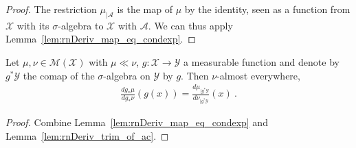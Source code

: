 \begin{proof}\leanok
{}
The restriction $\mu_{| \mathcal A}$ is the map of $\mu$ by the identity, seen as a function from $\mathcal X$ with its $\sigma$-algebra to $\mathcal X$ with $\mathcal{A}$.
We can thus apply Lemma~\ref{lem:rnDeriv_map_eq_condexp}.
\end{proof}


\begin{lemma}
  \label{lem:rnDeriv_map_eq_rnDeriv_trim}
  \uses{}
  Let $\mu, \nu \in \mathcal M(\mathcal X)$ with $\mu \ll \nu$, $g : \mathcal X \to \mathcal Y$ a measurable function and denote by $g^* \mathcal Y$ the comap of the $\sigma$-algebra on $\mathcal Y$ by $g$.
  Then $\nu$-almost everywhere,
  \begin{align*}
  \frac{d g_*\mu}{d g_*\nu}(g(x)) = \frac{d \mu_{| g^* \mathcal Y}}{d \nu_{| g^* \mathcal Y}}(x)
  \: .
  \end{align*}
\end{lemma}

\begin{proof}%
{}
Combine Lemma~\ref{lem:rnDeriv_map_eq_condexp} and Lemma~\ref{lem:rnDeriv_trim_of_ac}.
\end{proof}